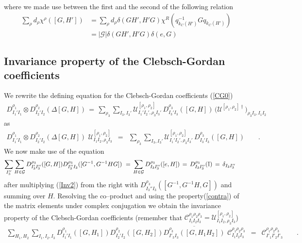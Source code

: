 \documentclass[nofootinbib,superscriptaddress,eqsecnum,tightenlines,11pt]{revtex4-1}
\def\q{\qquad}
\def\ba{\begin{eqnarray}}
\def\ea{\end{eqnarray}}
\begin{document}
where we made use between the first and the second of the following relation
\begin{align}
	\sum_{\rho} d_{\rho}\chi^{\rho}([G,H']) &= \sum_{\rho}d_{\rho}\delta(GH',H'G)\chi^R(q^{-1}_{k_C(H')}Gq_{k_C(H')}) \\ 
	&= |\mathcal{G}| \delta(GH',H'G)\delta(e,G)
\end{align}


\subsection{Invariance property of the Clebsch-Gordan coefficients \label{app_invar}}


We rewrite the defining equation for the Clebsch-Gordan coefficients (\ref{CG0})
\ba
D^{\rho_1}_{I_1'I_1} \otimes D^{\rho_2}_{I_2'I_2}(\Delta[G,H])
	\,=\,  \sum_{\rho_3}\sum_{I_3, I_3'}
	\mathcal{U}^{[\rho_1,\rho_2]}_{I_1'I_2',\rho_3I_3'}\,
	D^{\rho_3}_{I_3'I_3}([G,H])\,
	({\mathcal{U}^{[\rho_1,\rho_2] \dagger}) _{\rho_3I_3,I_1I_2}}
\ea
as
\ba\label{Inv2}
D^{\rho_1}_{I_1'I_1} \otimes D^{\rho_2}_{I_2'I_2}(\Delta[G,H])  \,\,\mathcal{U}^{[\rho_1,\rho_2] }_{I_1I_2,\rho_3I_3}
	&=&  \sum_{\rho_3}\sum_{I_3, I_3'}
	\mathcal{U}^{[\rho_1,\rho_2]}_{I_1'I_2',\rho_3I_3'}\,
	D^{\rho_3}_{I_3'I_3}([G,H]) \q .
\ea
We now make use of the equation
\ba
\sum_{I''_3}\sum_{H\in {\cal G}} D^{\rho_3}_{I_3'I''_3}([G,H])  D^{\rho_3}_{I_3'' I_3}([G^{-1},G^{-1}HG])  \,   \,=\, 
\sum_{H\in {\cal G}}       D^{\rho_3}_{I_3I''_3}([e,H])  \,=\, D^{\rho_3}_{I_3 I''_3}( \mathbb{I}) \,=\, \delta_{I_3 I_3''}  \q 
\ea
after multiplying (\ref{Inv2}) from the right with $D^{\rho_3}_{I_3'' I_3}([G^{-1},G^{-1}H,G])$ and summing over $H$. Resolving the co--product and using the property(\ref{contra}) of the matrix elements under complex conjugation we obtain the invariance property of the Clebsch-Gordan coefficients (remember that $\mathcal{C}^{\rho_1 \rho_2\rho_3}_{I_1 I_2 I_3} = 
	\mathcal{U}^{[\rho_1 ,\rho_2]}_{I_1 I_2,\rho_3I_3}$)
\ba
\sum_{H_1,H_2} \sum_{I_1,I_2,I_3} 
D^{\rho_1}_{I_1'I_1}([G,H_1])   D^{\rho_2}_{I_2'I_2}([G,H_2]) \overline{ D^{\rho_3}_{I'_3 I_3}([G, H_1H_2])  }
\,\,\mathcal{C}^{\rho_1 \rho_2\rho_3}_{I_1 I_2 I_3} &=&
\mathcal{C}^{\rho_1 \rho_2\rho_3}_{I'_1 I'_2 I'_3} \q .
\ea 
\end{document}
